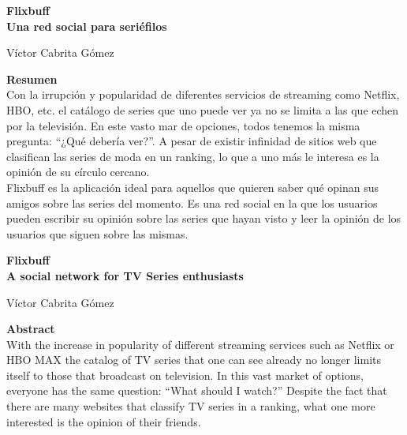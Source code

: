 \thispagestyle{empty}

\begin{center}
{\large\bfseries Flixbuff \\ Una red social para seriéfilos }\\
\end{center}
\begin{center}
Víctor Cabrita Gómez\\
\end{center}

\vspace{0.7cm}

\noindent\textbf{Resumen}\\

Con la irrupción y popularidad de diferentes servicios de streaming como Netflix, HBO, etc. el catálogo de series que uno puede ver ya no se limita a las que echen por la televisión. En este vasto mar de opciones, todos tenemos la misma pregunta: ``¿Qué debería ver?''. A pesar de existir infinidad de sitios web que clasifican las series de moda en un ranking, lo que a uno más le interesa es la opinión de su círculo cercano.\\

Flixbuff es la aplicación ideal para aquellos que quieren saber qué opinan sus amigos sobre las series del momento. Es una red social en la que los usuarios pueden escribir su opinión sobre las series que hayan visto y leer la opinión de los usuarios que siguen sobre las mismas.

\cleardoublepage{}

\begin{center}
	{\large\bfseries Flixbuff \\ A social network for TV Series enthusiasts}\\
\end{center}
\begin{center}
	Víctor Cabrita Gómez\\
\end{center}
\vspace{0.7cm}

\noindent\textbf{Abstract}\\

With the increase in popularity of different streaming services such as Netflix or HBO MAX the catalog of TV series that one can see already no longer limits itself to those that broadcast on television. In this vast market of options, everyone has the same question: ``What should I watch?'' Despite the fact that there are many websites that classify TV series in a ranking, what one more interested is the opinion of their friends.\\

